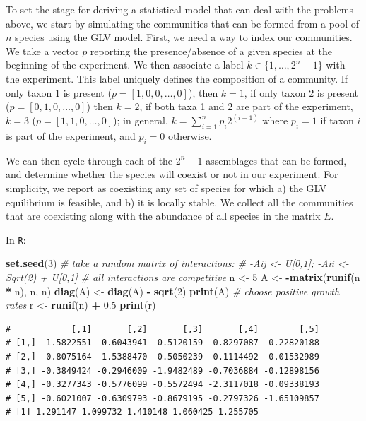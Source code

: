 \documentclass[]{book}
\newenvironment{Shaded}{\begin{snugshade}}{\end{snugshade}}
\newcommand{\CommentTok}[1]{\textcolor[rgb]{0.56,0.35,0.01}{\textit{#1}}}
\newcommand{\DecValTok}[1]{\textcolor[rgb]{0.00,0.00,0.81}{#1}}
\newcommand{\FloatTok}[1]{\textcolor[rgb]{0.00,0.00,0.81}{#1}}
\newcommand{\KeywordTok}[1]{\textcolor[rgb]{0.13,0.29,0.53}{\textbf{#1}}}
\newcommand{\NormalTok}[1]{#1}
\newcommand{\OperatorTok}[1]{\textcolor[rgb]{0.81,0.36,0.00}{\textbf{#1}}}
\newcommand{\StringTok}[1]{\textcolor[rgb]{0.31,0.60,0.02}{#1}}
\begin{document}
To set the stage for deriving a statistical model that can deal with the problems above, we start by simulating the communities that can be formed from a pool of \(n\) species using the GLV model. First, we need a way to index our communities. We take a vector \(p\) reporting the presence/absence of a given species at the beginning of the experiment. We then associate a label \(k \in \{1, \ldots, 2^n -1\}\) with the experiment. This label uniquely defines the composition of a community. If only taxon 1 is present (\(p = [1,0,0,\ldots,0]\)), then \(k = 1\), if only taxon 2 is present (\(p =[0,1,0,\ldots,0]\)) then \(k = 2\), if both taxa 1 and 2 are part of the experiment, \(k = 3\) (\(p = [1,1,0,\ldots,0]\)); in general, \(k = \sum_{i = 1}^n p_i 2^{(i-1)}\) where \(p_i = 1\) if taxon \(i\) is part of the experiment, and \(p_i = 0\) otherwise.

We can then cycle through each of the \(2^n - 1\) assemblages that can be formed, and determine whether the species will coexist or not in our experiment. For simplicity, we report as coexisting any set of species for which a) the GLV equilibrium is feasible, and b) it is locally stable. We collect all the communities that are coexisting along with the abundance of all species in the matrix \(E\).

In \texttt{R}:

\begin{Shaded}
\begin{Highlighting}[]
\KeywordTok{set.seed}\NormalTok{(}\DecValTok{3}\NormalTok{)}
\CommentTok{# take a random matrix of interactions: }
\CommentTok{# -Aij <- U[0,1]; -Aii <- Sqrt(2) + U[0,1]}
\CommentTok{# all interactions are competitive}
\NormalTok{n <-}\StringTok{ }\DecValTok{5}
\NormalTok{A <-}\StringTok{ }\OperatorTok{-}\KeywordTok{matrix}\NormalTok{(}\KeywordTok{runif}\NormalTok{(n }\OperatorTok{*}\StringTok{ }\NormalTok{n), n, n)}
\KeywordTok{diag}\NormalTok{(A) <-}\StringTok{ }\KeywordTok{diag}\NormalTok{(A) }\OperatorTok{-}\StringTok{ }\KeywordTok{sqrt}\NormalTok{(}\DecValTok{2}\NormalTok{)}
\KeywordTok{print}\NormalTok{(A)}
\CommentTok{# choose positive growth rates}
\NormalTok{r <-}\StringTok{ }\KeywordTok{runif}\NormalTok{(n) }\OperatorTok{+}\StringTok{ }\FloatTok{0.5}
\KeywordTok{print}\NormalTok{(r)}
\end{Highlighting}
\end{Shaded}

\begin{verbatim}
#            [,1]       [,2]       [,3]       [,4]        [,5]
# [1,] -1.5822551 -0.6043941 -0.5120159 -0.8297087 -0.22820188
# [2,] -0.8075164 -1.5388470 -0.5050239 -0.1114492 -0.01532989
# [3,] -0.3849424 -0.2946009 -1.9482489 -0.7036884 -0.12898156
# [4,] -0.3277343 -0.5776099 -0.5572494 -2.3117018 -0.09338193
# [5,] -0.6021007 -0.6309793 -0.8679195 -0.2797326 -1.65109857
# [1] 1.291147 1.099732 1.410148 1.060425 1.255705
\end{verbatim}
\end{document}
